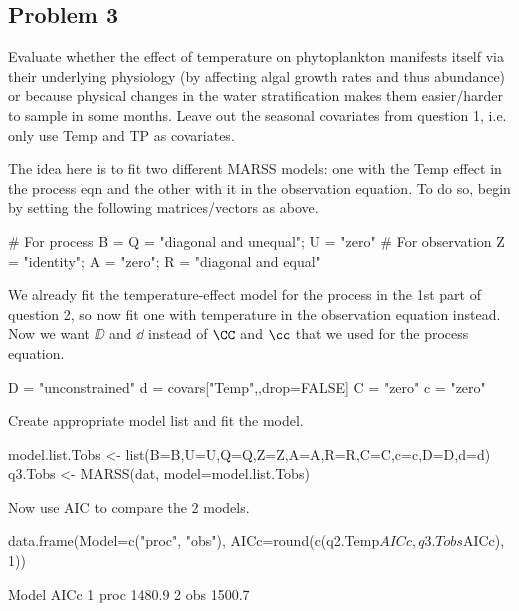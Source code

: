 \clearpage

\subsection*{Problem 3}
Evaluate whether the effect of temperature on phytoplankton manifests itself via their underlying physiology (by affecting algal growth rates and thus abundance) or because physical changes in the water stratification makes them easier/harder to sample in some months. Leave out the seasonal covariates from question 1, i.e. only use Temp and TP as covariates.

\bigskip

The idea here is to fit two different MARSS models: one with the Temp effect
in the process eqn and the other with it in the observation equation. To do so, begin by setting the following matrices/vectors as above.
\begin{Schunk}
\begin{Sinput}
 # For process
 B = Q = "diagonal and unequal"; U = "zero"
 # For observation
 Z = "identity"; A = "zero"; R = "diagonal and equal"
\end{Sinput}
\end{Schunk}
We already fit the temperature-effect model for the process in the 1st part of question 2, so now fit one with temperature in the observation equation instead. Now we want $\DD$ and $\dd$ instead of $\CC$ and $\cc$ that we used for the process equation.
\begin{Schunk}
\begin{Sinput}
 D = "unconstrained"
 d = covars["Temp",,drop=FALSE]
 C = "zero"
 c = "zero"
\end{Sinput}
\end{Schunk}
Create appropriate model list and fit the model.
\begin{Schunk}
\begin{Sinput}
 model.list.Tobs <- list(B=B,U=U,Q=Q,Z=Z,A=A,R=R,C=C,c=c,D=D,d=d)
 q3.Tobs <- MARSS(dat, model=model.list.Tobs)
\end{Sinput}
\end{Schunk}
Now use AIC to compare the 2 models.
\begin{Schunk}
\begin{Sinput}
 data.frame(Model=c("proc", "obs"),
   	   AICc=round(c(q2.Temp$AICc, q3.Tobs$AICc), 1))
\end{Sinput}
\begin{Soutput}
  Model   AICc
1  proc 1480.9
2   obs 1500.7
\end{Soutput}
\end{Schunk}

